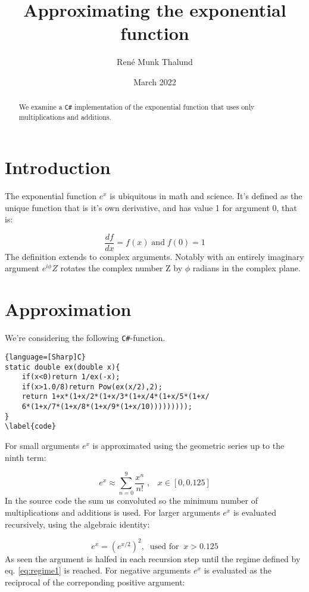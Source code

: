 \documentclass[a4paper]{article}
\title{Approximating the exponential function}
\author{René Munk Thalund}
\date{March 2022}
\begin{document}
\maketitle
\begin{abstract}
We examine a \texttt{C\#} implementation of the exponential function that uses only multiplications and additions.
\end{abstract}

\section{Introduction}
The exponential function $e^x$ is ubiquitous in math and science. It's defined as the unique function that is it's own derivative, and has value 1 for argument 0, that is:

\begin{equation}
    \frac{df}{dx} = f(x) \; \textrm{and} \;  f(0) = 1
\end{equation}
The definition extends to complex arguments. Notably with an entirely imaginary argument $e^{i\phi} Z$ rotates the complex number Z by $\phi$ radians in the complex plane.


\section{Approximation}
We're considering the following \texttt{C\#}-function.

\begin{lstlisting}{language=[Sharp]C}
static double ex(double x){
    if(x<0)return 1/ex(-x);
    if(x>1.0/8)return Pow(ex(x/2),2);
    return 1+x*(1+x/2*(1+x/3*(1+x/4*(1+x/5*(1+x/
    6*(1+x/7*(1+x/8*(1+x/9*(1+x/10)))))))));
}
\label{code}
\end{lstlisting}
For small arguments $e^x$ is approximated using the geometric series up to the ninth term:

\begin{equation}
    \label{eq:regime1}
    e^x \approx \sum_{n = 0}^9 \frac{x^n}{n!} \; ,\;\;\; x \in [0,0.125]
\end{equation}
In the source code the sum us convoluted so the minimum number of multiplications and additions is used. For larger arguments $e^x$ is evaluated recursively, using the algebraic identity:

\begin{equation}
    \label{eq:regime2}
    e^x = (e^{x/2})^2, \;\; \textrm{used for}\;\;  x > 0.125
\end{equation}
As seen the argument is halfed in each recursion step until the regime defined by eq. \ref{eq:regime1} is reached. For negative arguments $e^x$ is evaluated as the reciprocal of the correponding positive argument:
\end{document}
